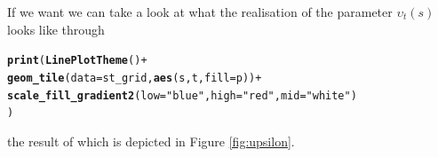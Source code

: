 \documentclass[a4paper,11pt]{article}\usepackage[]{graphicx}\usepackage[]{color}
\makeatletter
\newcommand{\hlstr}[1]{\textcolor[rgb]{0.192,0.494,0.8}{#1}}%
\newcommand{\hlopt}[1]{\textcolor[rgb]{0,0,0}{#1}}%
\newcommand{\hlstd}[1]{\textcolor[rgb]{0.345,0.345,0.345}{#1}}%
\newcommand{\hlkwc}[1]{\textcolor[rgb]{0.333,0.667,0.333}{#1}}%
\newcommand{\hlkwd}[1]{\textcolor[rgb]{0.737,0.353,0.396}{\textbf{#1}}}%
\newenvironment{kframe}{%
 \def\at@end@of@kframe{}%
 \ifinner\ifhmode%
  \def\at@end@of@kframe{\end{minipage}}%
  \begin{minipage}{\columnwidth}%
 \fi\fi%
 \def\FrameCommand##1{\hskip\@totalleftmargin \hskip-\fboxsep
 \colorbox{shadecolor}{##1}\hskip-\fboxsep
     \hskip-\linewidth \hskip-\@totalleftmargin \hskip\columnwidth}%
 \MakeFramed {\advance\hsize-\width
   \@totalleftmargin\z@ \linewidth\hsize
   \@setminipage}}%
 {\par\unskip\endMakeFramed%
 \at@end@of@kframe}
\newenvironment{knitrout}{}{} %
\makeatother
\begin{document}
If we want we can take a look at what the realisation of the parameter $\upsilon_t(s)$ looks like through
\begin{knitrout}
\color{fgcolor}\begin{kframe}
\begin{alltt}
\hlkwd{print}\hlstd{(}\hlkwd{LinePlotTheme}\hlstd{()} \hlopt{+}
        \hlkwd{geom_tile}\hlstd{(}\hlkwc{data}\hlstd{=st_grid,}\hlkwd{aes}\hlstd{(s,t,}\hlkwc{fill}\hlstd{=p))} \hlopt{+}
        \hlkwd{scale_fill_gradient2}\hlstd{(}\hlkwc{low}\hlstd{=}\hlstr{"blue"}\hlstd{,}\hlkwc{high}\hlstd{=}\hlstr{"red"}\hlstd{,}\hlkwc{mid}\hlstd{=}\hlstr{"white"}\hlstd{)}
      \hlstd{)}
\end{alltt}
\end{kframe}
\end{knitrout}
\noindent the result of which is depicted in Figure \ref{fig:upsilon}.
\end{document}

